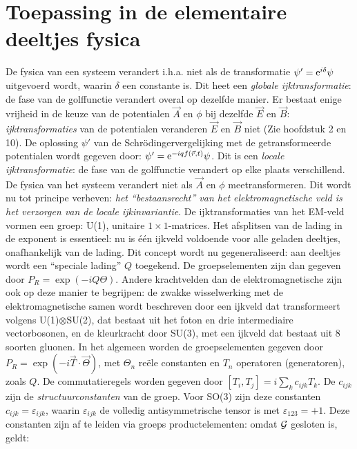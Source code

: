 \section{Toepassing in de elementaire deeltjes fysica}
De fysica van een systeem verandert i.h.a. niet als de transformatie
$\psi'={\rm e}^{i\delta}\psi$ uitgevoerd wordt, waarin $\delta$ een constante
is. Dit heet een {\it globale ijktransformatie}: de fase van de golffunctie
verandert overal op dezelfde manier.
\npar
Er bestaat enige vrijheid in de keuze van de potentialen $\vec{A}$ en $\phi$
bij dezelfde $\vec{E}$ en $\vec{B}$: {\it ijktransformaties} van de
potentialen veranderen $\vec{E}$ en $\vec{B}$ niet (Zie hoofdstuk 2 en 10).
De oplossing $\psi'$ van de\linebreak
Schr\"odingervergelijking met de getransformeerde potentialen wordt gegeven
door: $\psi'={\rm e}^{-iqf(\vec{r},t)}\psi$.
\npar
Dit is een {\it locale ijktransformatie}: de fase van de golffunctie
verandert op elke plaats verschillend. De fysica van het systeem verandert
niet als $\vec{A}$ en $\phi$ meetransformeren. Dit wordt nu tot principe
verheven: {\it het ``bestaansrecht'' van het elektromagnetische veld is het
verzorgen van de locale ijkinvariantie}.
\npar
De ijktransformaties van het EM-veld vormen een groep: U(1), unitaire
$1\times1$-matrices. Het afsplitsen van de lading in de exponent is
essentieel: nu is \'e\'en ijkveld voldoende voor alle geladen deeltjes,
onafhankelijk van de lading.
\npar
Dit concept wordt nu gegeneraliseerd: aan deeltjes wordt een ``speciale
lading'' $Q$ toegekend. De groepselementen zijn dan gegeven door
$P_R=\exp(-iQ\Theta)$.
\npar
Andere krachtvelden dan de elektromagnetische zijn ook op deze manier te
begrijpen: de zwakke wisselwerking met de elektromagnetische samen wordt
beschreven door een ijkveld dat transformeert volgens U(1)$\otimes$SU(2), dat
bestaat uit het foton en drie intermediaire vectorbosonen, en de kleurkracht
door SU(3), met een ijkveld dat bestaat uit 8 soorten gluonen.
\npar
In het algemeen worden de groepselementen gegeven door
$P_R=\exp(-i\vec{T}\cdot\vec{\Theta})$, met $\Theta_n$ re\"ele constanten en
$T_n$ operatoren (generatoren), zoals $Q$. De commutatieregels worden gegeven
door $[T_i,T_j]=i\sum\limits_kc_{ijk}T_k$. De $c_{ijk}$ zijn de
{\it structuurconstanten} van de groep. Voor SO(3) zijn deze constanten
$c_{ijk}=\varepsilon_{ijk}$, waarin $\varepsilon_{ijk}$ de volledig
antisymmetrische tensor is met $\varepsilon_{123}=+1$.
\npar
Deze constanten zijn af te leiden via groeps productelementen: omdat ${\cal{G}}$
gesloten is, geldt:\\
